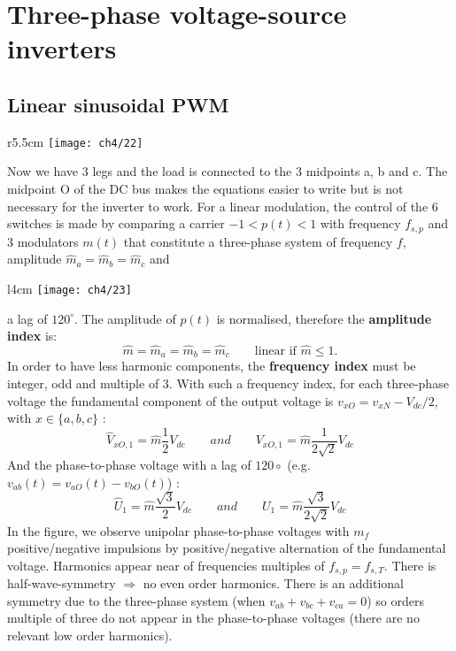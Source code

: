\section{Three-phase voltage-source inverters}
	\subsection{Linear sinusoidal PWM}
		\begin{wrapfigure}[7]{r}{5.5cm}
		\vspace{-5mm}
		\texttt{[image: ch4/22]}
		\end{wrapfigure}
		Now we have 3 legs and the load is connected to the 3 midpoints a, b and c. The midpoint O of the DC bus makes the equations easier to write but is not necessary for the inverter to work. For a linear modulation, the control of the 6 switches is made by comparing a carrier $-1< p(t)<1$ with frequency $f_{s,p}$ and 3 modulators $m(t)$ that constitute a three-phase system of frequency $f$, amplitude $\hat{m}_a=\hat{m}_b=\hat{m}_c$ and 
		
		\begin{wrapfigure}[11]{l}{4cm}
		\vspace{-5mm}
		\texttt{[image: ch4/23]}
		\end{wrapfigure}
		a lag of $120^\circ$. The amplitude of $p(t)$ is normalised, therefore the \textbf{amplitude index} is:
		\begin{equation}
			\hat{m} = \hat{m}_a = \hat{m}_b = \hat{m}_c \qquad \mbox{linear if } \hat{m} \leq 1.
		\end{equation}
		In order to have less harmonic components, the \textbf{frequency index} must be integer, odd and multiple of 3. With such a frequency index, for each three-phase voltage the fundamental component of the output voltage is $v_{xO} = v_{xN}-V_{dc}/2$, with $x \in \{a, b, c\}$ : 
		\begin{equation}
			\hat{V}_{xO,1} = \hat{m}\frac{1}{2}V_{dc}\qquad and \qquad V_{xO,1} = \hat{m}\frac{1}{2\sqrt{2}}V_{dc}
		\end{equation}
		And the phase-to-phase voltage with a lag of $120\circ$ (e.g. $v_{ab}(t) = v_{aO}(t) - v_{bO}(t)$) :
		\begin{equation}
			\hat{U}_{1} = \hat{m}\frac{\sqrt{3}}{2}V_{dc}\qquad and \qquad U_{1} = \hat{m}\frac{\sqrt{3}}{2\sqrt{2}}V_{dc}
		\end{equation}
		In the figure, we observe unipolar phase-to-phase voltages with $m_f$ positive/negative impulsions by positive/negative alternation of the fundamental voltage. Harmonics appear near of frequencies multiples of $f_{s,p} =f_{s,T}$. There is half-wave-symmetry $\Rightarrow$ no even order harmonics. There is an additional symmetry due to the three-phase system (when $v_{ab} + v_{bc} + v_{ca} = 0$) so orders multiple of three do not appear in the phase-to-phase voltages (there are no relevant low order harmonics). 
		
